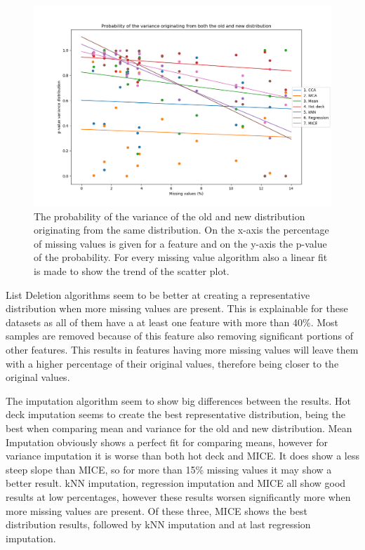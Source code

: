 \documentclass[10pt,a4paper]{article}
\begin{document}
	\begin{figure}[H]
		\centering
		\includegraphics[width=\textwidth]{P_variance.PNG}
		\caption{The probability of the variance of the old and new distribution originating from the same distribution. On the x-axis the percentage of missing values is given for a feature and on the y-axis the p-value of the probability. For every missing value algorithm also a linear fit is made to show the trend of the scatter plot.}
		\label{fig:PVarianceFits}
	\end{figure}
	
	List Deletion algorithms seem to be better at creating a representative distribution when more missing values are present. This is explainable for these datasets as all of them have a at least one feature with more than 40\%. Most samples are removed because of this feature also removing significant portions of other features. This results in features having more missing values will leave them with a higher percentage of their original values, therefore being closer to the original values.
	
	The imputation algorithm seem to show big differences between the results. Hot deck imputation seems to create the best representative distribution, being the best when comparing mean and variance for the old and new distribution. Mean Imputation obviously shows a perfect fit for comparing means, however for variance imputation it is worse than both hot deck and MICE. It does show a less steep slope than MICE, so for more than 15\% missing values it may show a better result. kNN imputation, regression imputation and MICE all show good results at low percentages, however these results worsen significantly more when more missing values are present. Of these three, MICE shows the best distribution results, followed by kNN imputation and at last regression imputation.
	
\end{document}
